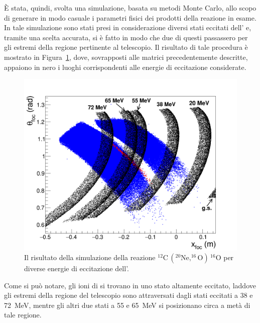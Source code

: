 È stata, quindi, svolta una simulazione, basata su metodi Monte Carlo, allo scopo di generare in modo casuale i parametri fisici dei prodotti della reazione in esame.
In tale simulazione sono stati presi in considerazione diversi stati eccitati dell' e, tramite una scelta accurata, si è fatto in modo che due di questi passassero per gli estremi della regione pertinente al telescopio.
Il risultato di tale procedura è mostrato in Figura~\ref{fig:simulazione}, dove, sovrapposti alle matrici precedentemente descritte, appaiono in nero i luoghi corrispondenti alle energie di eccitazione considerate.
\begin{figure} [!p]
	\centering
	\includegraphics[width=\textwidth, keepaspectratio]{Grafici_Tesi/Test/simulazione.png}
	\caption{Il risultato della simulazione della reazione $^{12}\mbox{C}\,  ( ^{20}\mbox{Ne}, ^{16}\mbox{O} ) \, ^{16}\mbox{O} $ per diverse energie di eccitazione dell'.} \label{fig:simulazione}
\end{figure}
Come si può notare, gli ioni di  si trovano in uno stato altamente eccitato, laddove gli estremi della regione del telescopio sono attraversati dagli stati eccitati a 38 e 72~MeV, mentre gli altri due stati a 55 e 65~MeV si posizionano circa a metà di tale regione.
